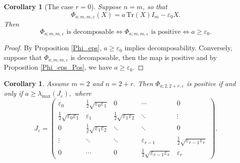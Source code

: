 \documentclass[12pt,a4paper]{amsart}
\theoremstyle{plain}
\newtheorem{corollary}[theorem]{Corollary}
\theoremstyle{remark}
\theoremstyle{definition}
\newcommand{\Tr}{{\textrm{Tr}}}
\begin{document}
\begin{corollary}[The case $r=0$] \label{Cor_r0}  \rm
	Suppose $n=m$, so that
	\[
	\Phi_{a;m,m,\varepsilon}(X)=a\,\Tr(X)I_m-\varepsilon_0 X.
	\]
	Then
	\[
	\Phi_{a;m,m,\varepsilon}\text{ is decomposable}
	\iff
	\Phi_{a;m,m,\varepsilon}\text{ is positive}
	\iff
	a\ge \varepsilon_0.
	\]
\end{corollary}

\begin{proof}
	By Proposition \ref{Phi_eps},  $a\ge \varepsilon_0$ implies decomposability.
	Conversely, suppose that $\Phi_{a;m,m,\varepsilon}$ is decomposable, then the map is positive and by Proposition \ref{Phi_eps_Pos}, we have $a\ge \varepsilon_0$. %
\end{proof}

\begin{corollary} \label{Cor_m2_Pos} %
	\rm
	Assume $m=2$ and $n=2+r$. Then $\Phi_{a;2,2+r,\varepsilon}$ is positive if and only if
$	a\ge \lambda_{\max}(J_\varepsilon),$
	where
	\[
	J_\varepsilon=
	\begin{pmatrix}
		\varepsilon_0 & \frac12\sqrt{\varepsilon_0\varepsilon_1} & 0 & \cdots & 0\\
		\frac12\sqrt{\varepsilon_0\varepsilon_1} & \varepsilon_1 &
		\frac12\sqrt{\varepsilon_1\varepsilon_2} & \ddots & \vdots\\
		0 & \frac12\sqrt{\varepsilon_1\varepsilon_2} & \ddots & \ddots & 0\\
		\vdots & \ddots & \ddots & \varepsilon_{r-1} &
		\frac12\sqrt{\varepsilon_{r-1}\varepsilon_r}\\
		0 & \cdots & 0 & \frac12\sqrt{\varepsilon_{r-1}\varepsilon_r} & \varepsilon_r
	\end{pmatrix}.
	\]
\end{corollary}
\end{document}
